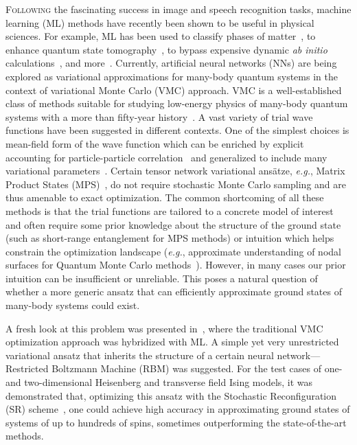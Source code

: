 \lettrine[lines=3]{F}{ollowing} the fascinating success in image and speech recognition tasks, machine learning (ML) methods have recently been shown to be useful in physical sciences. For example, ML has been used to classify phases of matter~\cite{carrasquilla2017machine}, to enhance quantum state tomography~\cite{torlai2018neural,sehayek2019learnability}, to bypass expensive dynamic \textit{ab initio} calculations~\cite{brockherde2017bypassing}, and more~\cite{carleo2019machine}. Currently, artificial neural networks (NNs) are being explored as variational approximations for many-body quantum systems in the context of variational Monte Carlo (VMC) approach. VMC is a well-established class of methods suitable for studying low-energy physics of many-body quantum systems with a more than fifty-year history~\cite{McMillan}. A vast variety of trial wave functions have been suggested in different contexts. One of the simplest choices is mean-field form of the wave function which can be enriched by explicit accounting for particle-particle correlation~\cite{gros1988superconductivity,giamarchi1991phase,dev1992jastrow} and generalized to include many variational parameters~\cite{umrigar2005energy,schautz2004optimized,harju1997stochastic,capello2005variational}. Certain tensor network variational ans\"atze, \textit{e.g.}, Matrix Product States (MPS)~\cite{verstraete2006matrix}, do not require stochastic Monte Carlo sampling and are thus amenable to exact optimization. The common shortcoming of all these methods is that the trial functions are tailored to a concrete model of interest and often require some prior knowledge about the structure of the ground state (such as short-range entanglement for MPS methods) or intuition  which helps constrain the optimization landscape (\textit{e.g.}, approximate understanding of nodal surfaces for Quantum Monte Carlo methods~\cite{anderson1995fixed}). However, in many cases our prior intuition can be insufficient or unreliable. This poses a natural question of whether a more generic ansatz that can efficiently approximate ground states of many-body systems could exist.

A fresh look at this problem was presented in~\cite{Carleo}, where the traditional VMC optimization approach was hybridized with ML. A simple yet very unrestricted variational ansatz that inherits the structure of a certain neural network---Restricted Boltzmann Machine (RBM) was suggested. For the test cases of one- and two-dimensional Heisenberg and transverse field Ising models, it was demonstrated that, optimizing this ansatz with the Stochastic Reconfiguration (SR) scheme~\cite{sorella2007weak}, one could achieve high accuracy in approximating ground states of systems of up to hundreds of spins, sometimes outperforming the state-of-the-art methods.

